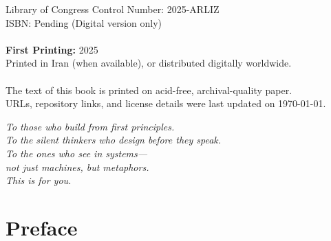 \documentclass[12pt, oneside, openany]{book}
\begin{document}
	\begin{flushleft}
	{\small
		Library of Congress Control Number: 2025-ARLIZ\\
		ISBN: Pending (Digital version only)\\
		\\
		\textbf{First Printing:} 2025\\
		Printed in Iran (when available), or distributed digitally worldwide.\\
		\\
		The text of this book is printed on acid-free, archival-quality paper.\\
		URLs, repository links, and license details were last updated on \today.
	}
	\end{flushleft}
\clearpage

\thispagestyle{empty}
\vspace*{6cm}
\begin{center}
	\emph{
		To those who build from first principles.\\
		To the silent thinkers who design before they speak.\\
		To the ones who see in systems—\\
		not just machines, but metaphors.\\
		This is for you.}
\end{center}

\pagestyle{empty}
	\chapter{Preface}
	\thispagestyle{empty}
\end{document}
